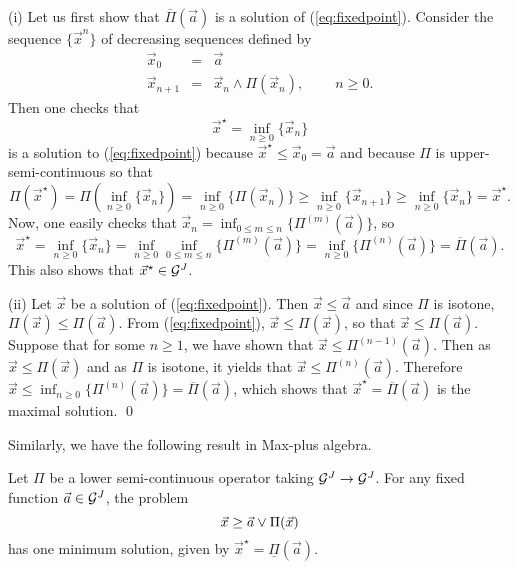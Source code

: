 \pr
\noindent
(i) Let us first show that $\overline{\Pi}(\vec{a})$
is a solution of (\ref{eq:fixedpoint}). Consider the sequence $\{ \vec{x}^n \} $
of decreasing sequences defined by
\begin{eqnarray*}
\vec{x}_0 & = & \vec{a} \\
\vec{x}_{n+1} & = &  \vec{x}_{n} \wedge \Pi(\vec{x}_{n}), \;\;\;\;\;\;\;\; n\geq
0.
\end{eqnarray*}
Then one checks that
\[ \vec{x}^{\star} = \inf_{n \geq 0} \{ \vec{x}_{n} \} \]
is a solution to (\ref{eq:fixedpoint}) because $\vec{x}^{\star} \leq
\vec{x}_0=\vec{a}$
and because  $\Pi$ is upper-semi-continuous so that
\[ \Pi(\vec{x}^{\star})  =  \Pi( \inf_{n \geq 0} \{ \vec{x}_{n} \} ) =
\inf_{n \geq 0} \{ \Pi( \vec{x}_{n} ) \}
         \geq  \inf_{n \geq 0} \{ \vec{x}_{n+1}  \} \geq \inf_{n \geq
0} \{ \vec{x}_{n}  \} = \vec{x}^{\star}. \]
Now, one easily checks that $ \vec{x}_{n} = \inf_{0 \leq m \leq n} \{
\Pi^{(m)} ( \vec{a} ) \} $,
so
\[ \vec{x}^{\star} = \inf_{n \geq 0} \{ \vec{x}_{n} \} = \inf_{n \geq 0}
\inf_{0 \leq m \leq n} \{ \Pi^{(m)} ( \vec{a} ) \} = \inf_{n \geq
0} \{ \Pi^{(n)} ( \vec{a} ) \} = \overline{\Pi}(\vec{a}). \] This
also shows that $\vec{x}^{\star} \in \mathcal G^J$.

 \vspace{0.5ex} \noindent (ii) Let $\vec{x}$ be a
solution of (\ref{eq:fixedpoint}). Then $\vec{x} \leq \vec{a}$ and
since $\Pi $ is isotone, $\Pi (\vec{x} ) \leq \Pi (\vec{a})$. From
(\ref{eq:fixedpoint}), $\vec{x} \leq \Pi ( \vec{x} ) $, so that
$\vec{x} \leq \Pi ( \vec{a}) $. Suppose that for some $n \geq 1$,
we have shown that $\vec{x} \leq \Pi^{(n-1)} ( \vec{a}) $. Then as
$\vec{x} \leq \Pi ( \vec{x} ) $ and as $\Pi $ is isotone, it
yields that $\vec{x} \leq \Pi^{(n)} ( \vec{a}) $. Therefore
$\vec{x} \leq \inf_{n \geq 0} \{ \Pi^{(n)} ( \vec{a}) \} =
\overline{\Pi}(\vec{a}) $, which shows that $\vec{x}^{\star} =
\overline{\Pi}(\vec{a})$ is the maximal solution. \qed

Similarly, we have the following result in Max-plus algebra.
\begin{theorem}
Let $\Pi$ be a lower semi-continuous operator taking $\mathcal G^J \rightarrow \mathcal G^J$. For any fixed function $\vec{a} \in \mathcal G^{J}$, the problem
\begin{equation}
\mylabel{eq:dualfixedpoint}
\vec{x} \geq \vec{a} \vee \Pi(\vec{x})
\end{equation}
has one minimum solution, given by $\vec{x}^{\star}=\underline{\Pi}(\vec{a})$.
\end{theorem}

